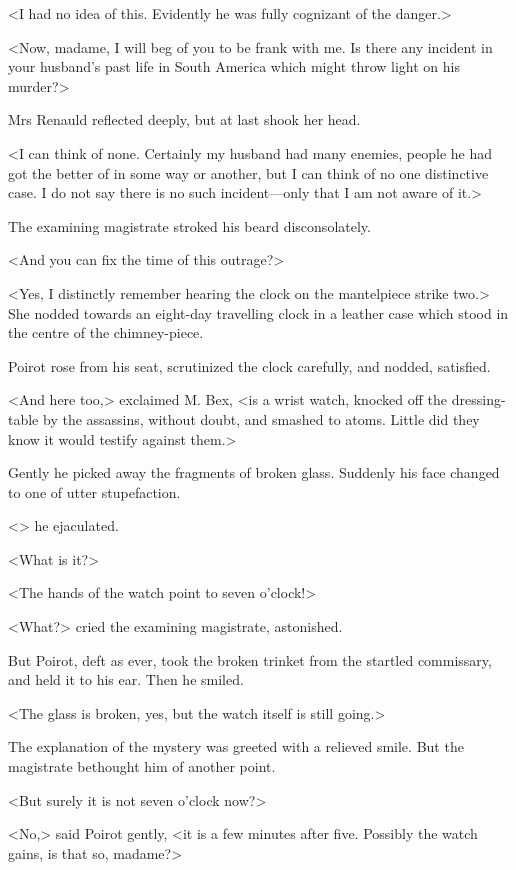  <I had no idea of this. Evidently he was fully cognizant of the danger.> 

 <Now, madame, I will beg of you to be frank with me. Is there any incident in your husband's past life in South America which might throw light on his murder?> 

 Mrs Renauld reflected deeply, but at last shook her head. 

 <I can think of none. Certainly my husband had many enemies, people he had got the better of in some way or another, but I can think of no one distinctive case. I do not say there is no such incident—only that I am not aware of it.> 

 The examining magistrate stroked his beard disconsolately. 

 <And you can fix the time of this outrage?> 

 <Yes, I distinctly remember hearing the clock on the mantelpiece strike two.> She nodded towards an eight-day travelling clock in a leather case which stood in the centre of the chimney-piece. 

 Poirot rose from his seat, scrutinized the clock carefully, and nodded, satisfied. 

 <And here too,> exclaimed M. Bex, <is a wrist watch, knocked off the dressing-table by the assassins, without doubt, and smashed to atoms. Little did they know it would testify against them.> 

 Gently he picked away the fragments of broken glass. Suddenly his face changed to one of utter stupefaction. 

 <> he ejaculated. 

 <What is it?> 

 <The hands of the watch point to seven o'clock!> 

 <What?> cried the examining magistrate, astonished. 

 But Poirot, deft as ever, took the broken trinket from the startled commissary, and held it to his ear. Then he smiled. 

 <The glass is broken, yes, but the watch itself is still going.> 

 The explanation of the mystery was greeted with a relieved smile. But the magistrate bethought him of another point. 

 <But surely it is not seven o'clock now?> 

 <No,> said Poirot gently, <it is a few minutes after five. Possibly the watch gains, is that so, madame?> 

